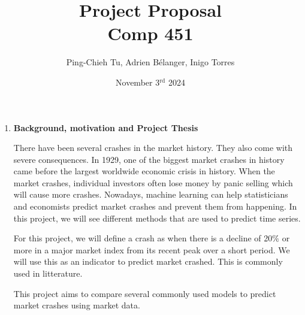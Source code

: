 \documentclass[12pt, letterpaper]{article}
\title{
  Project Proposal \\
  \Large Comp 451}
\author{Ping-Chieh Tu, Adrien Bélanger, Inigo Torres}
\date{November 3$^{\text{rd}}$ 2024}
\begin{document}
\maketitle 

\begin{enumerate}[label=]
    \item \textbf{Background, motivation and Project Thesis}

    There have been several crashes in the market history. They also come with severe consequences. In 1929, one of the biggest market crashes in history came before the largest worldwide economic crisis in history. When the market crashes, individual investors often lose money by panic selling which will cause more crashes. Nowadays, machine learning can help statisticians and economists predict market crashes and prevent them from happening. In this project, we will see different methods that are used to predict time series.

    For this project, we will define a crash as when there is a decline of 20$\%$ or more in a major market index from its recent peak over a short period. We will use this as an indicator to predict market crashed. This is commonly used in litterature.
    
    This project aims to compare several commonly used models to predict market crashes using market data.
    

\end{enumerate}
\end{document}
